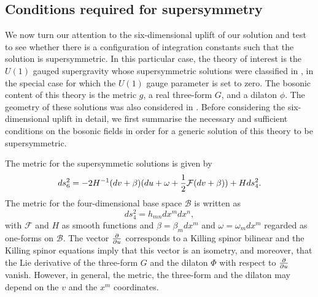 \subsection{Conditions required for supersymmetry}

We now turn our attention to the six-dimensional uplift of our solution and test to see whether there is a configuration of integration constants such that the solution is supersymmetric. In this particular case, the theory of interest is the $U(1)$ gauged supergravity whose supersymmetric solutions were classified in \cite{Cariglia:2004kk}, in the special case for which the $U(1)$ gauge parameter is set to zero. The bosonic content of this theory is the metric $g$, a real three-form $G$, and a dilaton $\phi$. The geometry of these solutions was also considered in \cite{Bena:2011dd}. Before considering the six-dimensional uplift in detail, we first summarise the necessary and sufficient conditions on the bosonic fields in order for a generic solution of this theory to be supersymmetric.

The metric for the supersymmetic solutions is given by
\begin{equation}
\label{eq:benamet}
    ds^2_6 = -2H^{-1} (dv + \beta) (du + \omega + \frac{1}{2} \mathcal{F}(dv+\beta)) + H ds_4^2.
\end{equation}
The metric for the four-dimensional base space $\mathcal{B}$ is written as
\begin{equation}
    ds^2_4 = h_{mn}dx^m dx^n,
\end{equation}
with $\mathcal{F}$ and $H$ as smooth functions and $\beta=\beta_m dx^m$ and $\omega = \omega_m dx^m$ regarded as one-forms on $\mathcal{B}$. The vector ${\partial \over \partial u}$ corresponds to a Killing spinor bilinear and the Killing spinor equations imply that this vector is an isometry, and moreover, that the Lie derivative of the three-form $G$ and the dilaton $\Phi$ with respect to ${\partial \over \partial u}$ vanish. However, in general, the metric, the three-form and the dilaton may depend on the $v$ and the $x^m$ coordinates.


